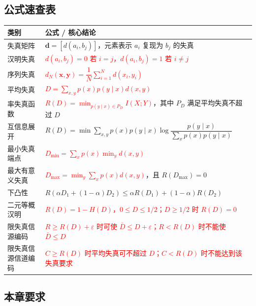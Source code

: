 \subsection{公式速查表}

{\scriptsize
\noindent\begin{tabularx}{\textwidth}{@{}l>{\raggedright\arraybackslash}X@{}}
\toprule
\textbf{类别} & \textbf{公式 / 核心结论} \\
\midrule
失真矩阵 & $\mathbf d=[d(a_i,b_j)]$，元素表示 $a_i$ 复现为 $b_j$ 的失真 \\
\midrule
汉明失真 & \textcolor{Red}{$d(a_i,b_j)=0$ 若 $i=j$，$d(a_i,b_j)=1$ 若 $i\ne j$} \\
\midrule
序列失真 & \textcolor{Red}{$d_N(\mathbf x,\mathbf y)=\dfrac1N\sum_{i=1}^{N}d(x_i,y_i)$} \\
\midrule
平均失真 & \textcolor{Red}{$D=\sum_{x,y}p(x)p(y\mid x)d(x,y)$} \\
\midrule
率失真函数 & \textcolor{Red}{$R(D)=\min_{p(y\mid x)\in P_D}I(X;Y)$}，其中 $P_D$ 满足平均失真不超过 $D$ \\
\midrule
互信息展开 & $R(D)=\min\sum_{x,y}p(x)p(y\mid x)\log\dfrac{p(y\mid x)}{\sum_xp(x)p(y\mid x)}$ \\
\midrule
最小失真端点 & \textcolor{Red}{$D_{\min}=\sum_xp(x)\min_y d(x,y)$} \\
\midrule
最大有意义失真 & \textcolor{Red}{$D_{\max}=\min_y\sum_xp(x)d(x,y)$}，且 $R(D_{\max})=0$ \\
\midrule
下凸性 & $R(\alpha D_1+(1-\alpha)D_2)\le\alpha R(D_1)+(1-\alpha)R(D_2)$ \\
\midrule
二元等概汉明 & \textcolor{Red}{$R(D)=1-H(D)$，$0\le D\le1/2$；$D\ge1/2$ 时 $R(D)=0$} \\
\midrule
限失真信源编码 & \textcolor{Red}{$R\ge R(D)+\varepsilon$ 时可使 $\bar D\le D+\varepsilon$；$R<R(D)$ 时不能使 $\bar D\le D$} \\
\midrule
限失真信源信道编码 & \textcolor{Red}{$C\ge R(D)$ 时平均失真可不超过 $D$；$C<R(D)$ 时不能达到该失真要求} \\
\bottomrule
\end{tabularx}
}

\subsection{本章要求}

